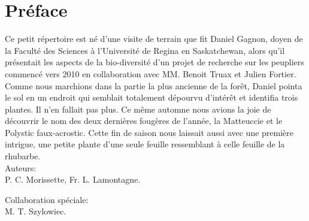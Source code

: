 \chapter*{Préface}

Ce petit répertoire est né d'une visite
de terrain que fit Daniel Gagnon, doyen de la Faculté des Sciences à l’Université de Regina en Saskatchewan, alors qu'il
présentait les aspects de la bio-diversité
d'un projet de recherche sur les peupliers commencé
vers 2010 en collaboration avec MM. Benoit Truax
et Julien Fortier.
Comme nous marchions dans la partie la plus ancienne de la forêt,
Daniel pointa le sol en un endroit qui semblait
totalement dépourvu d'intérêt et identifia trois plantes.
Il n'en fallait pas plus.
Ce même automne nous avions la joie de découvrir
le nom des deux dernières fougères de l'année,
la Matteuccie et le Polystic faux-acrostic.
Cette fin de saison nous laissait aussi avec
une première intrigue, une petite plante d'une seule feuille ressemblant à celle feuille de la rhubarbe. \\
	
Auteurs:\\
P. C. Morissette,
Fr. L. Lamontagne.
	
Collaboration spéciale:\\  
M. T. Szylowiec.
